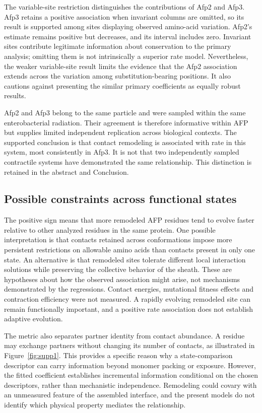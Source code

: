 \documentclass[11pt,a4paper]{article}
\begin{document}
The variable-site restriction distinguishes the contributions of Afp2 and Afp3. Afp3 retains a positive association when invariant columns are omitted, so its result is supported among sites displaying observed amino-acid variation. Afp2's estimate remains positive but decreases, and its interval includes zero. Invariant sites contribute legitimate information about conservation to the primary analysis; omitting them is not intrinsically a superior rate model. Nevertheless, the weaker variable-site result limits the evidence that the Afp2 association extends across the variation among substitution-bearing positions. It also cautions against presenting the similar primary coefficients as equally robust results.

Afp2 and Afp3 belong to the same particle and were sampled within the same enterobacterial radiation. Their agreement is therefore informative within AFP but supplies limited independent replication across biological contexts. The supported conclusion is that contact remodeling is associated with rate in this system, most consistently in Afp3. It is not that two independently sampled contractile systems have demonstrated the same relationship. This distinction is retained in the abstract and Conclusion.

\subsection{Possible constraints across functional states}

The positive sign means that more remodeled AFP residues tend to evolve faster relative to other analyzed residues in the same protein. One possible interpretation is that contacts retained across conformations impose more persistent restrictions on allowable amino acids than contacts present in only one state. An alternative is that remodeled sites tolerate different local interaction solutions while preserving the collective behavior of the sheath. These are hypotheses about how the observed association might arise, not mechanisms demonstrated by the regressions. Contact energies, mutational fitness effects and contraction efficiency were not measured. A rapidly evolving remodeled site can remain functionally important, and a positive rate association does not establish adaptive evolution.

The metric also separates partner identity from contact abundance. A residue may exchange partners without changing its number of contacts, as illustrated in Figure~\ref{fig:supp1}. This provides a specific reason why a state-comparison descriptor can carry information beyond monomer packing or exposure. However, the fitted coefficient establishes incremental information conditional on the chosen descriptors, rather than mechanistic independence. Remodeling could covary with an unmeasured feature of the assembled interface, and the present models do not identify which physical property mediates the relationship.
\end{document}
